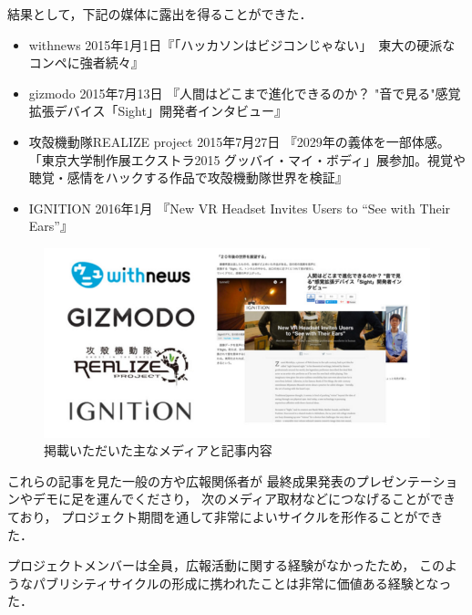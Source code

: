 結果として，下記の媒体に露出を得ることができた．

\begin{itemize}
 \item withnews 2015年1月1日『「ハッカソンはビジコンじゃない」　東大の硬派なコンペに強者続々』
 \item gizmodo 2015年7月13日 『人間はどこまで進化できるのか？ "音で見る"感覚拡張デバイス「Sight」開発者インタビュー』
 \item 攻殻機動隊REALIZE project 2015年7月27日 『2029年の義体を一部体感。「東京大学制作展エクストラ2015 グッバイ・マイ・ボディ」展参加。視覚や聴覚・感情をハックする作品で攻殻機動隊世界を検証』
 \item IGNITION 2016年1月 『New VR Headset Invites Users to “See with Their Ears”』
\end{itemize}

\begin{figure}[h]
\begin{center}
\includegraphics[width=120mm, bb=0 0 674 330]{images/publicity/publicity.png}
\caption{掲載いただいた主なメディアと記事内容}
\end{center}
\end{figure}


これらの記事を見た一般の方や広報関係者が
最終成果発表のプレゼンテーションやデモに足を運んでくださり，
次のメディア取材などにつなげることができており，
プロジェクト期間を通して非常によいサイクルを形作ることができた．

プロジェクトメンバーは全員，広報活動に関する経験がなかったため，
このようなパブリシティサイクルの形成に携われたことは非常に価値ある経験となった．








